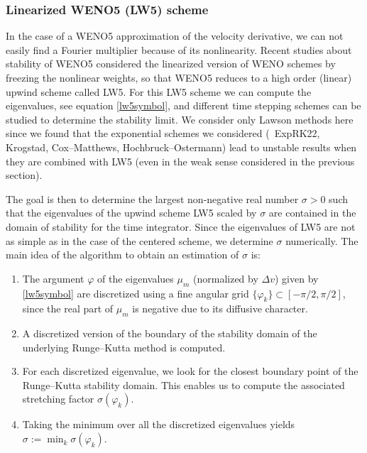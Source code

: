 \subsubsection{Linearized WENO5 (LW5) scheme}

In the case of a WENO5 approximation of the velocity derivative, we can not easily find a Fourier multiplier because of its nonlinearity. Recent studies about stability of WENO5 \cite{Wang:2007, Motamed:2010, Lunet:2017} considered the linearized version of WENO schemes by freezing the nonlinear weights, so that WENO5 reduces to a high order (linear) upwind scheme called LW5. For this LW5 scheme we can compute the eigenvalues, see equation \eqref{lw5symbol}, and different time stepping schemes can be studied to determine the stability limit. We consider only Lawson methods here since we found that the exponential schemes we considered (\ie{}~ExpRK22, Krogstad, Cox--Matthews, Hochbruck--Ostermann) lead to unstable results when they are combined with LW5 (even in the weak sense considered in the previous section).

The goal  is then to determine the largest non-negative real number $\sigma>0$ such that the eigenvalues of the upwind scheme LW5 scaled by $\sigma$ are contained in the domain of stability for the time integrator. Since the eigenvalues of LW5 are not as simple as in the case of the centered scheme, we determine $\sigma$ numerically. The main idea of the algorithm to obtain an estimation of $\sigma$ is:
\begin{enumerate}
  \item The argument $\varphi$ of the eigenvalues $\mu_m$  (normalized by $\Delta v$) given by \eqref{lw5symbol} are discretized using a fine angular grid $\{ \varphi_k\} \subset [-\pi/2, \pi/2]$, since the real part of $\mu_{m}$ is negative due to its diffusive character.
  \item A discretized version of the boundary of the stability domain of the underlying Runge--Kutta method is computed.
  \item For each discretized eigenvalue, we look for the closest boundary point of the Runge--Kutta stability domain. 
  This enables us to compute the associated stretching factor $\sigma(\varphi_k)$.
  \item Taking the minimum over all the discretized eigenvalues yields $\sigma:=\min_{k} \sigma(\varphi_k)$. 
\end{enumerate}

